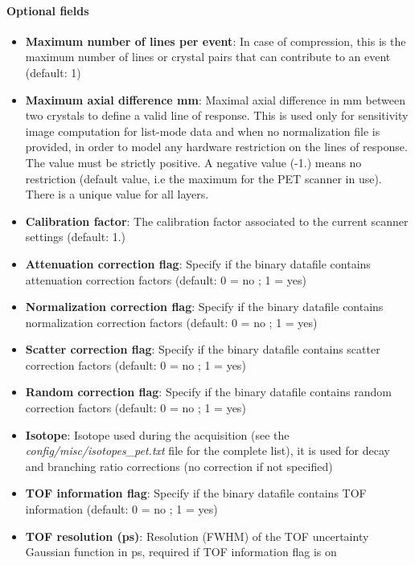 \documentclass[a4paper, 11pt]{article}
\begin{document}
\paragraph{Optional fields}
\begin{itemize}
  \item \textbf{Maximum number of lines per event}: In case of compression, this is the maximum number of lines or crystal pairs that can contribute to
        an event (default: 1)
  \item \textbf{Maximum axial difference mm}: Maximal axial difference in mm between two crystals to define a valid line of response.
        This is used only for sensitivity image computation for list-mode data and when no normalization file is provided, in order to model any hardware restriction on the lines of response. The value must be strictly positive. A negative value (-1.) means no restriction (default value, i.e the maximum for the PET scanner in use). There is a unique value for all layers.  
  \item \textbf{Calibration factor}: The calibration factor associated to the current scanner settings (default: 1.)
  \item \textbf{Attenuation correction flag}: Specify if the binary datafile contains attenuation correction factors (default: 0 = no ; 1 = yes)
  \item \textbf{Normalization correction flag}: Specify if the binary datafile contains normalization correction factors (default: 0 = no ; 1 = yes)
  \item \textbf{Scatter correction flag}: Specify if the binary datafile contains scatter correction factors (default: 0 = no ; 1 = yes)
  \item \textbf{Random correction flag}: Specify if the binary datafile contains random correction factors (default: 0 = no ; 1 = yes)
  \item \textbf{Isotope}: Isotope used during the acquisition (see the \textit{config/misc/isotopes\_pet.txt} file for the complete list),
                          it is used for decay and branching ratio corrections (no correction if not specified)
  \item \textbf{TOF information flag}: Specify if the binary datafile contains TOF information (default: 0 = no ; 1 = yes)
  \item \textbf{TOF resolution (ps)}: Resolution (FWHM) of the TOF uncertainty Gaussian function in ps, required if TOF information flag is on

\end{itemize}
\end{document}
